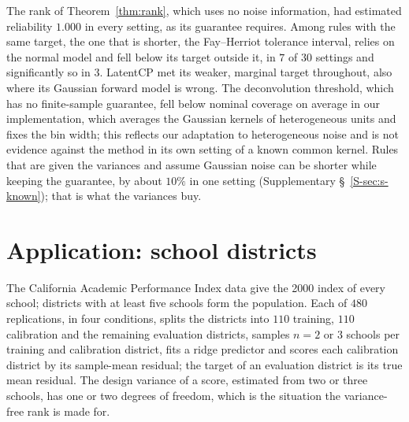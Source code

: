 \documentclass[12pt]{article}
\theoremstyle{definition}
\begin{document}
The rank of Theorem~\ref{thm:rank}, which uses no noise information, had estimated reliability $1.000$ in every setting, as its guarantee requires. Among rules with the same target, the one that is shorter, the Fay--Herriot tolerance interval, relies on the normal model and fell below its target outside it, in $7$ of $30$ settings and significantly so in $3$. LatentCP met its weaker, marginal target throughout, also where its Gaussian forward model is wrong. The deconvolution threshold, which has no finite-sample guarantee, fell below nominal coverage on average in our implementation, which averages the Gaussian kernels of heterogeneous units and fixes the bin width; this reflects our adaptation to heterogeneous noise and is not evidence against the method in its own setting of a known common kernel. Rules that are given the variances and assume Gaussian noise can be shorter while keeping the guarantee, by about $10\%$ in one setting (Supplementary \S~\ref{S-sec:s-known}); that is what the variances buy.

\section{Application: school districts}\label{sec:application}

The California Academic Performance Index data \citep{lumley2004} give the 2000 index of every school; districts with at least five schools form the population. Each of $480$ replications, in four conditions, splits the districts into $110$ training, $110$ calibration and the remaining evaluation districts, samples $n = 2$ or $3$ schools per training and calibration district, fits a ridge predictor and scores each calibration district by its sample-mean residual; the target of an evaluation district is its true mean residual. The design variance of a score, estimated from two or three schools, has one or two degrees of freedom, which is the situation the variance-free rank is made for.
\end{document}
